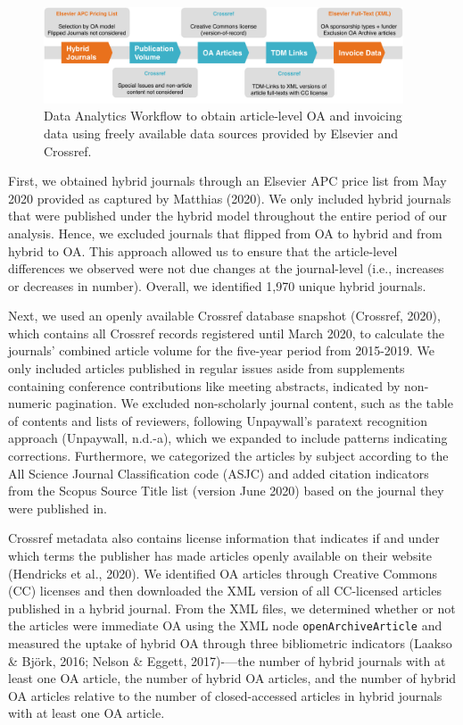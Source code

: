 \documentclass[a4paper,man,floatsintext,longtable,noextraspace,12pt]{apa6}
\begin{document}
\begin{figure}[H]

{\centering \includegraphics[width=0.95\textwidth]{../figure/els_flow.pdf}

}

\caption{Data Analytics Workflow to obtain article-level OA and invoicing data using freely available data sources provided by Elsevier and Crossref.
}\label{fig:workflow}
\end{figure}

First, we obtained hybrid journals through an Elsevier APC price list
from May 2020 provided as captured by Matthias (2020). We only included
hybrid journals that were published under the hybrid model throughout
the entire period of our analysis. Hence, we excluded journals that
flipped from OA to hybrid and from hybrid to OA. This approach allowed
us to ensure that the article-level differences we observed were not due
changes at the journal-level (i.e., increases or decreases in number).
Overall, we identified 1,970 unique hybrid journals.

Next, we used an openly available Crossref database snapshot (Crossref,
2020), which contains all Crossref records registered until March 2020,
to calculate the journals' combined article volume for the five-year
period from 2015-2019. We only included articles published in regular
issues aside from supplements containing conference contributions like
meeting abstracts, indicated by non-numeric pagination. We excluded
non-scholarly journal content, such as the table of contents and lists
of reviewers, following Unpaywall's paratext recognition approach
(Unpaywall, n.d.-a), which we expanded to include patterns indicating
corrections. Furthermore, we categorized the articles by subject
according to the All Science Journal Classification code (ASJC) and
added citation indicators from the Scopus Source Title list (version
June 2020) based on the journal they were published in.

Crossref metadata also contains license information that indicates if
and under which terms the publisher has made articles openly available
on their website (Hendricks et al., 2020). We identified OA articles
through Creative Commons (CC) licenses and then downloaded the XML
version of all CC-licensed articles published in a hybrid journal. From
the XML files, we determined whether or not the articles were immediate
OA using the XML node \texttt{openArchiveArticle} and measured the
uptake of hybrid OA through three bibliometric indicators (Laakso \&
Björk, 2016; Nelson \& Eggett, 2017)-\/---the number of hybrid journals
with at least one OA article, the number of hybrid OA articles, and the
number of hybrid OA articles relative to the number of closed-accessed
articles in hybrid journals with at least one OA article.
\end{document}
